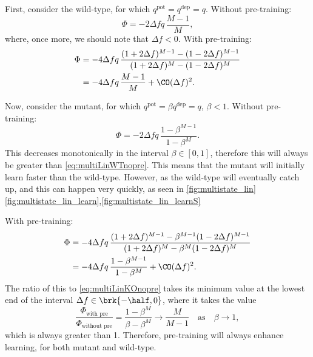 \documentclass[12pt]{article}
\newcommand{\pot}{^{\text{pot}}}
\newcommand{\dep}{^{\text{dep}}}
\begin{document}
First, consider the wild-type, for which $q\pot=q\dep=q$.
Without pre-training:
%
\begin{equation}\label{eq:multiLinWTnopre}
  \Phi = -2\Delta fq\,\frac{M-1}{M},
\end{equation}
%
where, once more, we should note that $\Delta f<0$.
With pre-training:
%
\begin{equation}\label{eq:multiLinWTpre}
\begin{aligned}
  \Phi &= -4\Delta f q \, \frac{(1+2\Delta f)^{M-1} - (1-2\Delta f)^{M-1}}
          {(1+2\Delta f)^M - (1-2\Delta f)^M} \\
       &= -{4\Delta f q}\,\frac{M-1}{M} + \CO(\Delta f)^2.
\end{aligned}
\end{equation}
%

Now, consider the mutant, for which $q\pot=\beta q\dep=q$, $\beta<1$.
Without pre-training:
%
\begin{equation}\label{eq:multiLinKOnopre}
  \Phi = -2\Delta f q\,\frac{1-\beta^{M-1}}{1-\beta^M}.
\end{equation}
%
This decreases monotonically in the interval $\beta\in[0,1]$, therefore this will always be greater than \eqref{eq:multiLinWTnopre}.
This means that the mutant will initially learn faster than the wild-type.
However, as the wild-type will eventually catch up, and this can happen very quickly, as seen in \autoref{fig:multistate_lin}\ref{fig:multistate_lin_learn},\ref{fig:multistate_lin_learnS}

With pre-training:
%
\begin{equation}\label{eq:multiLinKOpre}
\begin{aligned}
  \Phi &= -4\Delta f q \, \frac{(1+2\Delta f)^{M-1} - \beta^{M-1}(1-2\Delta f)^{M-1}}
          {(1+2\Delta f)^M - \beta^M(1-2\Delta f)^M} \\
       &= -4\Delta f q\,\frac{1-\beta^{M-1}}{1-\beta^M} + \CO(\Delta f)^2.
\end{aligned}
\end{equation}
%
The ratio of this to \eqref{eq:multiLinKOnopre} takes its minimum value at the lowest end of the interval $\Delta f \in \brk{-\half,0}$, where it takes the value
%
\begin{equation}\label{eq:multiLinprenopre}
  \frac{\Phi_{\text{with pre}}}{\Phi_{\text{without pre}}} = \frac{1-\beta^M}{\beta-\beta^M}
   \longrightarrow \frac{M}{M-1} \quad \text{as} \quad \beta\to1,
\end{equation}
%
which is always greater than 1.
Therefore, pre-training will always enhance learning, for both mutant and wild-type.
\end{document}
